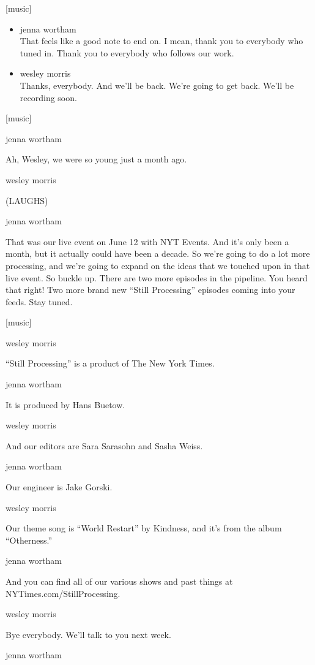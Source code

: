 {[}music{]}

\begin{itemize}
\item
  jenna wortham\\
  That feels like a good note to end on. I mean, thank you to everybody
  who tuned in. Thank you to everybody who follows our work.
\item
  wesley morris\\
  Thanks, everybody. And we'll be back. We're going to get back. We'll
  be recording soon.
\end{itemize}

{[}music{]}

jenna wortham

Ah, Wesley, we were so young just a month ago.

wesley morris

(LAUGHS)

jenna wortham

That was our live event on June 12 with NYT Events. And it's only been a
month, but it actually could have been a decade. So we're going to do a
lot more processing, and we're going to expand on the ideas that we
touched upon in that live event. So buckle up. There are two more
episodes in the pipeline. You heard that right! Two more brand new
``Still Processing'' episodes coming into your feeds. Stay tuned.

{[}music{]}

wesley morris

``Still Processing'' is a product of The New York Times.

jenna wortham

It is produced by Hans Buetow.

wesley morris

And our editors are Sara Sarasohn and Sasha Weiss.

jenna wortham

Our engineer is Jake Gorski.

wesley morris

Our theme song is ``World Restart'' by Kindness, and it's from the album
``Otherness.''

jenna wortham

And you can find all of our various shows and past things at
NYTimes.com/StillProcessing.

wesley morris

Bye everybody. We'll talk to you next week.

jenna wortham

